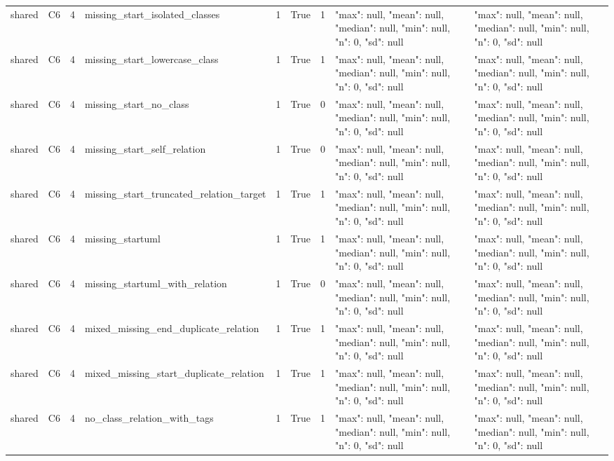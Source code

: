 \begin{tabular}{lllllllll}
shared & C6 & 4 & missing\_start\_isolated\_classes & 1 & True & 1 & {"max": null, "mean": null, "median": null, "min": null, "n": 0, "sd": null} & {"max": null, "mean": null, "median": null, "min": null, "n": 0, "sd": null} \\
shared & C6 & 4 & missing\_start\_lowercase\_class & 1 & True & 1 & {"max": null, "mean": null, "median": null, "min": null, "n": 0, "sd": null} & {"max": null, "mean": null, "median": null, "min": null, "n": 0, "sd": null} \\
shared & C6 & 4 & missing\_start\_no\_class & 1 & True & 0 & {"max": null, "mean": null, "median": null, "min": null, "n": 0, "sd": null} & {"max": null, "mean": null, "median": null, "min": null, "n": 0, "sd": null} \\
shared & C6 & 4 & missing\_start\_self\_relation & 1 & True & 0 & {"max": null, "mean": null, "median": null, "min": null, "n": 0, "sd": null} & {"max": null, "mean": null, "median": null, "min": null, "n": 0, "sd": null} \\
shared & C6 & 4 & missing\_start\_truncated\_relation\_target & 1 & True & 1 & {"max": null, "mean": null, "median": null, "min": null, "n": 0, "sd": null} & {"max": null, "mean": null, "median": null, "min": null, "n": 0, "sd": null} \\
shared & C6 & 4 & missing\_startuml & 1 & True & 1 & {"max": null, "mean": null, "median": null, "min": null, "n": 0, "sd": null} & {"max": null, "mean": null, "median": null, "min": null, "n": 0, "sd": null} \\
shared & C6 & 4 & missing\_startuml\_with\_relation & 1 & True & 0 & {"max": null, "mean": null, "median": null, "min": null, "n": 0, "sd": null} & {"max": null, "mean": null, "median": null, "min": null, "n": 0, "sd": null} \\
shared & C6 & 4 & mixed\_missing\_end\_duplicate\_relation & 1 & True & 1 & {"max": null, "mean": null, "median": null, "min": null, "n": 0, "sd": null} & {"max": null, "mean": null, "median": null, "min": null, "n": 0, "sd": null} \\
shared & C6 & 4 & mixed\_missing\_start\_duplicate\_relation & 1 & True & 1 & {"max": null, "mean": null, "median": null, "min": null, "n": 0, "sd": null} & {"max": null, "mean": null, "median": null, "min": null, "n": 0, "sd": null} \\
shared & C6 & 4 & no\_class\_relation\_with\_tags & 1 & True & 1 & {"max": null, "mean": null, "median": null, "min": null, "n": 0, "sd": null} & {"max": null, "mean": null, "median": null, "min": null, "n": 0, "sd": null} \\

\end{tabular}
